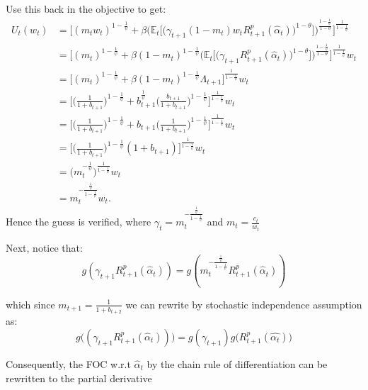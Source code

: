 \documentclass[12pt,a4paper]{article}
\begin{document}
Use this back in the objective to get:
\begin{align*}
     U_t(w_t) &= \bigg[ (m_tw_t)^{1-\frac{1}{\psi}}+\beta\bigg(\mathbb{E}_t\bigg[\big(\gamma_{t+1}(1-m_t)w_tR^{p}_{t+1}(\hat{\alpha}_t)\big)^{1-\theta}\bigg]\bigg)^\frac{1-\frac{1}{\psi}}{1-\theta}\bigg]^\frac{1}{1-\frac{1}{\psi}}\\
     &= \bigg[ (m_t)^{1-\frac{1}{\psi}}+\beta(1-m_t)^{1-\frac{1}{\psi}}\bigg(\mathbb{E}_t\bigg[\big(\gamma_{t+1}R^{p}_{t+1}(\hat{\alpha}_t)\big)^{1-\theta}\bigg]\bigg)^\frac{1-\frac{1}{\psi}}{1-\theta}\bigg]^\frac{1}{1-\frac{1}{\psi}}w_t\\
     &=\bigg[ (m_t)^{1-\frac{1}{\psi}}+\beta(1-m_t)^{1-\frac{1}{\psi}}\Lambda_{t+1}\bigg]^\frac{1}{1-\frac{1}{\psi}}w_t\\
     &=\bigg[ \bigg(\frac{1}{1+b_{t+1}}\bigg)^{1-\frac{1}{\psi}}+b_{t+1}^{\frac{1}{\psi}}\bigg(\frac{b_{t+1}}{1+b_{t+1}}\bigg)^{1-\frac{1}{\psi}}\bigg]^\frac{1}{1-\frac{1}{\psi}}w_t\\
     &=\bigg[ \bigg(\frac{1}{1+b_{t+1}}\bigg)^{1-\frac{1}{\psi}}+b_{t+1}\bigg(\frac{1}{1+b_{t+1}}\bigg)^{1-\frac{1}{\psi}}\bigg]^\frac{1}{1-\frac{1}{\psi}}w_t\\
     &=\bigg[ \bigg(\frac{1}{1+b_{t+1}}\bigg)^{1-\frac{1}{\psi}}(1+b_{t+1})\bigg]^\frac{1}{1-\frac{1}{\psi}}w_t\\
     &=\bigg(m_t^{-\frac{1}{\psi}}\bigg)^{\frac{1}{1-\frac{1}{\psi}}}w_t\\
     &= m_t^{-\frac{\frac{1}{\psi}}{1-\frac{1}{\psi}}}w_t.
\end{align*}
Hence the guess is verified, where $\gamma_t=m_t^{-\frac{\frac{1}{\psi}}{1-\frac{1}{\psi}}}$ and $m_t=\frac{c_t}{w_t}$

 Next, notice that:
\begin{equation*}
    g(\gamma_{t+1}R^{p}_{t+1}(\hat{\alpha}_t))=g(m_t^{-\frac{\frac{1}{\psi}}{1-\frac{1}{\psi}}}R^{p}_{t+1}(\hat{\alpha}_t))
\end{equation*}

which since $m_{t+1}=\frac{1}{1+b_{t+2}}$ we can rewrite by stochastic independence assumption as:
\begin{equation*}
     g\big((\gamma_{t+1}R^{p}_{t+1}(\hat{\alpha}_t))\big)=g(\gamma_{t+1})g\big(R^{p}_{t+1}(\hat{\alpha_t})\big)
\end{equation*}

Consequently, the FOC w.r.t $\hat{\alpha}_t$ by the chain rule of differentiation can be rewritten to the partial derivative
\end{document}
